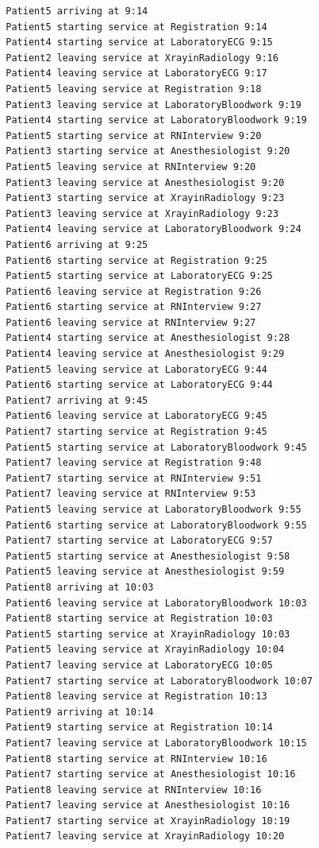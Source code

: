 \documentclass[12pt]{article}
\begin{document}
\begin{verbatim}
		Patient5 arriving at 9:14
		Patient5 starting service at Registration 9:14
		Patient4 starting service at LaboratoryECG 9:15
		Patient2 leaving service at XrayinRadiology 9:16
		Patient4 leaving service at LaboratoryECG 9:17
		Patient5 leaving service at Registration 9:18
		Patient3 leaving service at LaboratoryBloodwork 9:19
		Patient4 starting service at LaboratoryBloodwork 9:19
		Patient5 starting service at RNInterview 9:20
		Patient3 starting service at Anesthesiologist 9:20
		Patient5 leaving service at RNInterview 9:20
		Patient3 leaving service at Anesthesiologist 9:20
		Patient3 starting service at XrayinRadiology 9:23
		Patient3 leaving service at XrayinRadiology 9:23
		Patient4 leaving service at LaboratoryBloodwork 9:24
		Patient6 arriving at 9:25
		Patient6 starting service at Registration 9:25
		Patient5 starting service at LaboratoryECG 9:25
		Patient6 leaving service at Registration 9:26
		Patient6 starting service at RNInterview 9:27
		Patient6 leaving service at RNInterview 9:27
		Patient4 starting service at Anesthesiologist 9:28
		Patient4 leaving service at Anesthesiologist 9:29
		Patient5 leaving service at LaboratoryECG 9:44
		Patient6 starting service at LaboratoryECG 9:44
		Patient7 arriving at 9:45
		Patient6 leaving service at LaboratoryECG 9:45
		Patient7 starting service at Registration 9:45
		Patient5 starting service at LaboratoryBloodwork 9:45
		Patient7 leaving service at Registration 9:48
		Patient7 starting service at RNInterview 9:51
		Patient7 leaving service at RNInterview 9:53
		Patient5 leaving service at LaboratoryBloodwork 9:55
		Patient6 starting service at LaboratoryBloodwork 9:55
		Patient7 starting service at LaboratoryECG 9:57
		Patient5 starting service at Anesthesiologist 9:58
		Patient5 leaving service at Anesthesiologist 9:59
		Patient8 arriving at 10:03
		Patient6 leaving service at LaboratoryBloodwork 10:03
		Patient8 starting service at Registration 10:03
		Patient5 starting service at XrayinRadiology 10:03
		Patient5 leaving service at XrayinRadiology 10:04
		Patient7 leaving service at LaboratoryECG 10:05
		Patient7 starting service at LaboratoryBloodwork 10:07
		Patient8 leaving service at Registration 10:13
		Patient9 arriving at 10:14
		Patient9 starting service at Registration 10:14
		Patient7 leaving service at LaboratoryBloodwork 10:15
		Patient8 starting service at RNInterview 10:16
		Patient7 starting service at Anesthesiologist 10:16
		Patient8 leaving service at RNInterview 10:16
		Patient7 leaving service at Anesthesiologist 10:16
		Patient7 starting service at XrayinRadiology 10:19
		Patient7 leaving service at XrayinRadiology 10:20

\end{verbatim}
\end{document}
